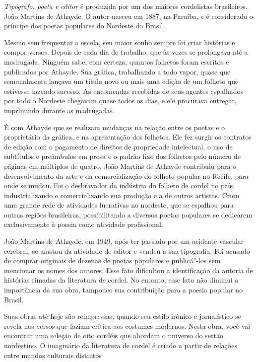 \documentclass[12pt]{extarticle}
\begin{document}
\emph{Tipógrafo, poeta e editor} é produzida por 
um dos maiores cordelistas brasileiros, João Martins de Athayde. O autor nasceu em
1887, na Paraíba, e é considerado o príncipe dos poetas populares do Nordeste
do Brasil. 

Mesmo sem frequentar a escola, seu maior sonho sempre foi criar histórias
e compor versos. Depois de cada dia de trabalho, que às vezes se prolongava até
a madrugada. Ninguém sabe, com certeza, quantos folhetos foram escritos
e publicados por Athayde. Sua gráfica, trabalhando a todo vapor, quase que
semanalmente lançava um título novo ou mais uma edição de um folheto que
estivesse fazendo sucesso. As encomendas recebidas de seus agentes espalhados
por todo o Nordeste chegavam quase todos os dias, e ele procurava entregar,
imprimindo durante as madrugadas. 

É com Athayde que se realizam mudanças na relação entre os poetas
e o proprietário da gráfica, e na apresentação dos folhetos. Ele fez surgir os
contratos de edição com o pagamento de direitos de propriedade intelectual,
o uso de subtítulos e preâmbulos em prosa e o padrão fixo dos folhetos pelo
número de páginas em múltiplos de quatro. João Martins de Athayde contribuiu
para o desenvolvimento da arte e da comercialização do folheto popular no
Recife, para onde se mudou. Foi o desbravador da indústria do folheto de cordel
no país, industrializando e comercializando sua produção e a de outros
artistas. Criou uma grande rede de atividades lucrativas no nordeste, que se
espalhou para outras regiões brasileiras, possibilitando a diversos poetas
populares se dedicarem exclusivamente à poesia como atividade profissional. 

João Martins de Athayde, em 1949, após ter passado por um acidente vascular
cerebral, se afastou da atividade de editor e vendeu a sua tipografia. Foi
acusado de comprar originais de dezenas de poetas populares e publicá"-los sem
mencionar os nomes dos autores. Esse fato dificultou a identificação da autoria
de histórias rimadas da literatura de cordel. No entanto, esse fato não diminui
a importância da sua obra, tampouco sua contribuição para a poesia popular no
Brasil.

Suas obras até hoje são reimpressas, quando seu estilo irônico e jornalístico
se revela nos versos que faziam crítica aos costumes modernos. Nesta obra, você
vai encontrar uma seleção de oito cordéis  que abordam o universo do sertão
nordestino. O imaginário da literatura de cordel é criado a partir de relações
entre mundos culturais distintos  
\end{document}
